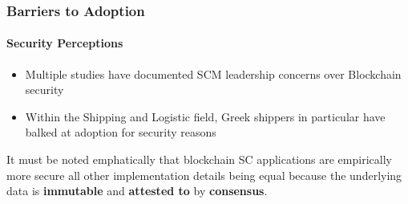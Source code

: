 \begin{frame}
  \frametitle{Barriers to Adoption}
  \framesubtitle{Security Perceptions}
  \begin{itemize}
    \item Multiple studies have documented SCM leadership concerns over Blockchain security
    \item Within the Shipping and Logistic field, Greek shippers in particular have balked at adoption for security reasons
  \end{itemize}

It must be noted emphatically that blockchain SC applications are empirically more secure all other implementation details being equal because the underlying data is \textbf{immutable} and \textbf{attested to} by \textbf{consensus}.


\end{frame}
